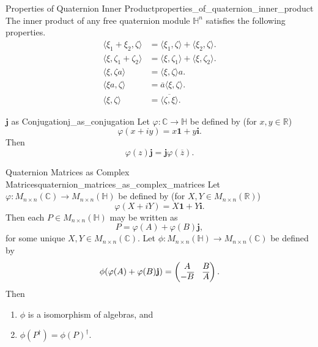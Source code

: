 \documentclass{article}
\begin{document}
\begin{proposition}{Properties of Quaternion Inner Product}{properties_of_quaternion_inner_product}
    The inner product of any free quaternion module $\mathbb{H}^n$ satisfies the following properties.
    \begin{align*}
        \langle \xi_1 + \xi_2, \zeta \rangle &= \langle \xi_1,\zeta \rangle + \langle \xi_2,\zeta \rangle. \\
        \langle \xi, \zeta_1+\zeta_2 \rangle &= \langle \xi,\zeta_1 \rangle + \langle \xi,\zeta_2 \rangle. \\
        \langle \xi, \zeta a \rangle &= \langle \xi,\zeta \rangle a. \\
        \langle \xi a, \zeta \rangle &= \overline{a} \langle \xi,\zeta \rangle. \\
        \langle \xi, \zeta \rangle &= \overline{\langle \zeta,\xi \rangle}.
    \end{align*}
\end{proposition}

\begin{proposition}{$\mathbf{j}$ as Conjugation}{j_as_conjugation}
    Let $\varphi: \mathbb{C} \rightarrow \mathbb{H}$ be defined by (for $x,y\in\mathbb{R}$)
    \[ \varphi(x+iy) = x\mathbf{1} + y\mathbf{i}. \]
    Then
    \[ \varphi(z)\mathbf{j} = \mathbf{j}\varphi(\overline{z}). \]
\end{proposition}

\begin{theorem}{Quaternion Matrices as Complex Matrices}{quaternion_matrices_as_complex_matrices}
    Let $\varphi: M_{n\times n}(\mathbb{C}) \rightarrow M_{n\times n}(\mathbb{H})$ be defined by (for $X,Y\in M_{n\times n}(\mathbb{R})$)
    \[ \varphi(X+iY) = X\mathbf{1} + Y\mathbf{i}. \]
    Then each $P\in M_{n\times n}(\mathbb{H})$ may be written as
    \[ P = \varphi(A) + \varphi(B)\mathbf{j}, \]
    for some unique $X,Y\in M_{n\times n}(\mathbb{C})$.
    Let $\phi: M_{n\times n}(\mathbb{H}) \rightarrow M_{n\times n}(\mathbb{C})$ be defined by
    \[ \phi\qty(\varphi(A) + \varphi(B)\mathbf{j}) = \begin{pmatrix}
        A & B \\ -\overline{B} & \overline{A}
    \end{pmatrix}. \]
    Then
    \begin{enumerate}
        \item $\phi$ is a isomorphism of algebras, and
        \item $\phi(P^\dagger) = \phi(P)^\dagger$.
    \end{enumerate}
\end{theorem}
\end{document}
